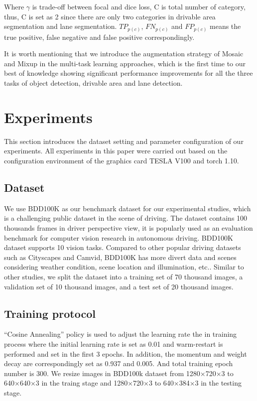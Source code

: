 \documentclass[10pt,twocolumn,letterpaper]{article}
\begin{document}
Where $\gamma$ is trade-off between focal and dice loss, C is total number of category, thus, C is set as 2 since there are only two categories in drivable area segmentation and lane segmentation. $TP_{p(c)}$, $FN_{p(c)}$ and $FP_{p(c)}$ means the true positive, false negative and false positive correspondingly.

It is worth mentioning that we introduce the augmentation strategy of Mosaic and Mixup \cite{zhang2017mixup} in the multi-task learning approaches, which is the first time to our best of knowledge showing significant performance improvements for all the three tasks of object detection, drivable area and lane detection.



\section{Experiments} \label{sec:experiments}
This section introduces the dataset setting and parameter configuration of our experiments. All experiments in this paper were carried out based on the configuration environment of the graphics card TESLA V100 and torch 1.10.

\subsection{Dataset}
We use BDD100K as our benchmark dataset for our experimental studies, which is a challenging public dataset in the scene of driving. The dataset contains 100 thousands frames in driver perspective view, it is popularly used as an evaluation benchmark for computer vision research in autonomous driving. 
BDD100K dataset supports 10 vision tasks. Compared to other popular driving datasets such as Cityscapes and Camvid, BDD100K has more divert data and scenes considering weather condition, scene location and illumination, etc..
Similar to other studies, we split the dataset into a training set of 70 thousand images, a validation set of 10 thousand images, and a test set of 20 thousand images. 

\subsection{Training protocol}
“Cosine Annealing” policy is used to adjust the learning rate the in training process where the initial learning rate is set as 0.01 and warm-restart \cite{loshchilov2016sgdr} is performed and set in the first 3 epochs. In addition, the momentum and weight decay are correspondingly set as 0.937 and 0.005. And total training epoch number is 300. We resize images in BDD100k dataset from
1280×720×3 to 640×640×3 in the traing stage and 1280×720×3 to 640×384×3 in the testing stage.
\end{document}
